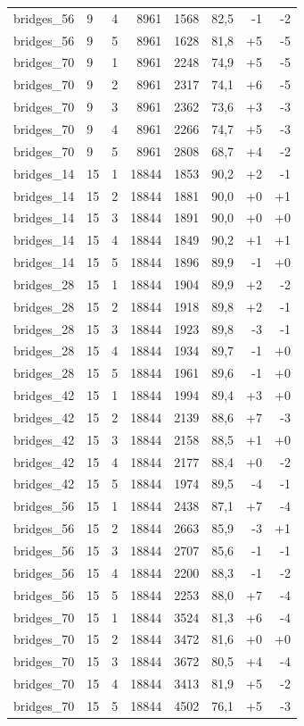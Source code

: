 \begin{longtable}{@{}llrrrrrr@{}}
bridges\_56 & 9 & 4 & 8961 & 1568 & 82,5 & -1 & -2 \\
bridges\_56 & 9 & 5 & 8961 & 1628 & 81,8 & +5 & -5 \\
bridges\_70 & 9 & 1 & 8961 & 2248 & 74,9 & +5 & -5 \\
bridges\_70 & 9 & 2 & 8961 & 2317 & 74,1 & +6 & -5 \\
bridges\_70 & 9 & 3 & 8961 & 2362 & 73,6 & +3 & -3 \\
bridges\_70 & 9 & 4 & 8961 & 2266 & 74,7 & +5 & -3 \\
bridges\_70 & 9 & 5 & 8961 & 2808 & 68,7 & +4 & -2 \\
bridges\_14 & 15 & 1 & 18844 & 1853 & 90,2 & +2 & -1 \\
bridges\_14 & 15 & 2 & 18844 & 1881 & 90,0 & +0 & +1 \\
bridges\_14 & 15 & 3 & 18844 & 1891 & 90,0 & +0 & +0 \\
bridges\_14 & 15 & 4 & 18844 & 1849 & 90,2 & +1 & +1 \\
bridges\_14 & 15 & 5 & 18844 & 1896 & 89,9 & -1 & +0 \\
bridges\_28 & 15 & 1 & 18844 & 1904 & 89,9 & +2 & -2 \\
bridges\_28 & 15 & 2 & 18844 & 1918 & 89,8 & +2 & -1 \\
bridges\_28 & 15 & 3 & 18844 & 1923 & 89,8 & -3 & -1 \\
bridges\_28 & 15 & 4 & 18844 & 1934 & 89,7 & -1 & +0 \\
bridges\_28 & 15 & 5 & 18844 & 1961 & 89,6 & -1 & +0 \\
bridges\_42 & 15 & 1 & 18844 & 1994 & 89,4 & +3 & +0 \\
bridges\_42 & 15 & 2 & 18844 & 2139 & 88,6 & +7 & -3 \\
bridges\_42 & 15 & 3 & 18844 & 2158 & 88,5 & +1 & +0 \\
bridges\_42 & 15 & 4 & 18844 & 2177 & 88,4 & +0 & -2 \\
bridges\_42 & 15 & 5 & 18844 & 1974 & 89,5 & -4 & -1 \\
bridges\_56 & 15 & 1 & 18844 & 2438 & 87,1 & +7 & -4 \\
bridges\_56 & 15 & 2 & 18844 & 2663 & 85,9 & -3 & +1 \\
bridges\_56 & 15 & 3 & 18844 & 2707 & 85,6 & -1 & -1 \\
bridges\_56 & 15 & 4 & 18844 & 2200 & 88,3 & -1 & -2 \\
bridges\_56 & 15 & 5 & 18844 & 2253 & 88,0 & +7 & -4 \\
bridges\_70 & 15 & 1 & 18844 & 3524 & 81,3 & +6 & -4 \\
bridges\_70 & 15 & 2 & 18844 & 3472 & 81,6 & +0 & +0 \\
bridges\_70 & 15 & 3 & 18844 & 3672 & 80,5 & +4 & -4 \\
bridges\_70 & 15 & 4 & 18844 & 3413 & 81,9 & +5 & -2 \\
bridges\_70 & 15 & 5 & 18844 & 4502 & 76,1 & +5 & -3 \\
\end{longtable}

